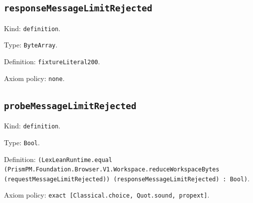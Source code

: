 \documentclass[11pt]{article}
\begin{document}
\subsection*{\texttt{responseMessageLimitRejected}}
\noindent Kind: \texttt{definition}.\par
\noindent Type: \texttt{ByteArray}.\par
\noindent Definition: \texttt{fixtureLiteral200}.\par
\noindent Axiom policy: \texttt{none}.\par
\subsection*{\texttt{probeMessageLimitRejected}}
\noindent Kind: \texttt{definition}.\par
\noindent Type: \texttt{Bool}.\par
\noindent Definition: \texttt{(LexLeanRuntime.equal (PrismPM.Foundation.Browser.V1.Workspace.reduceWorkspaceBytes (requestMessageLimitRejected)) (responseMessageLimitRejected) : Bool)}.\par
\noindent Axiom policy: \texttt{exact [Classical.choice, Quot.sound, propext]}.\par
\end{document}
